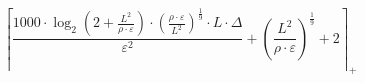 \[\left\lceil \frac{1000 \cdot \log_{2}\left(2 + \frac{L^{2}}{\rho \cdot \varepsilon}\right) \cdot \left(\frac{\rho \cdot \varepsilon}{L^{2}}\right)^{\frac{1}{9}} \cdot L \cdot \Delta}{\varepsilon^{2}} + \left(\frac{L^{2}}{\rho \cdot \varepsilon}\right)^{\frac{1}{9}} + 2 \right\rceil_{+}\]
